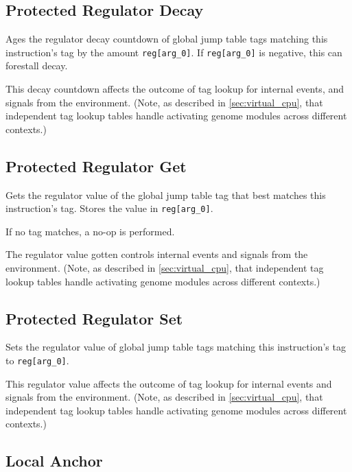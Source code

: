 \subsection{Protected Regulator Decay}


Ages the regulator decay countdown of global jump table tags matching this instruction's tag by the amount \texttt{reg[arg\_0]}.
If \texttt{reg[arg\_0]} is negative, this can forestall decay.

This decay countdown affects the outcome of tag lookup for internal events, and signals from the environment.
(Note, as described in \ref{sec:virtual_cpu}, that independent tag lookup tables handle activating genome modules across different contexts.)

\subsection{Protected Regulator Get}


Gets the regulator value of the global jump table tag that best matches this instruction's tag.
Stores the value in \texttt{reg[arg\_0]}.

If no tag matches, a no-op is performed.

The regulator value gotten controls internal events and signals from the environment.
(Note, as described in \ref{sec:virtual_cpu}, that independent tag lookup tables handle activating genome modules across different contexts.)

\subsection{Protected Regulator Set}


Sets the regulator value of global jump table tags matching this instruction's tag to \texttt{reg[arg\_0]}.

This regulator value affects the outcome of tag lookup for internal events and signals from the environment.
(Note, as described in \ref{sec:virtual_cpu}, that independent tag lookup tables handle activating genome modules across different contexts.)

\subsection{Local Anchor}

